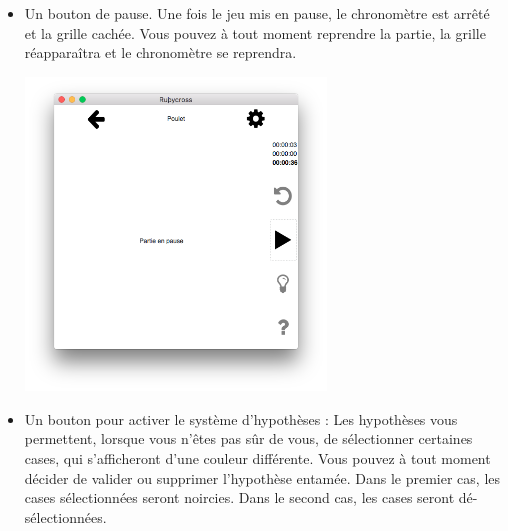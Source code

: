 \documentclass[a4paper, 12pt]{report}
\begin{document}
\begin{itemize}
                \item Un bouton de pause. Une fois le jeu mis en pause, le chronomètre est arrêté et la grille cachée. Vous pouvez à tout moment reprendre la partie, la grille réapparaîtra et le chronomètre se reprendra.\\
                \begin{minipage}{\linewidth}
                    \centering
			        \includegraphics[width=8cm]{imagePause.png}
	            \end{minipage}
                \item Un bouton pour activer le système d'hypothèses :
                Les hypothèses vous permettent, lorsque vous n'êtes pas sûr de vous, de sélectionner certaines cases, qui s'afficheront d'une couleur différente. Vous pouvez à tout moment décider de valider ou supprimer l'hypothèse entamée. Dans le premier cas, les cases sélectionnées seront noircies. Dans le second cas, les cases seront dé-sélectionnées.
                

\end{itemize}
\end{document}
